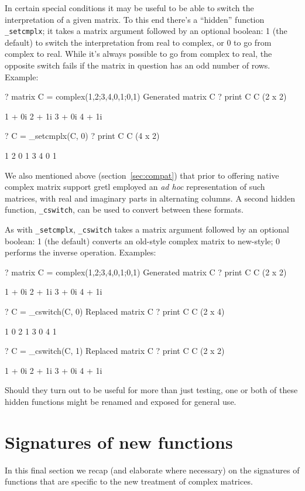 \documentclass{article}
\begin{document}
In certain special conditions it may be useful to be able to switch
the interpretation of a given matrix. To this end there's a ``hidden''
function \verb|_setcmplx|; it takes a matrix argument followed by an
optional boolean: 1 (the default) to switch the interpretation from
real to complex, or 0 to go from complex to real. While it's always
possible to go from complex to real, the opposite switch fails if the
matrix in question has an odd number of rows. Example:
\begin{code}
? matrix C = complex({1,2;3,4},{0,1;0,1})
Generated matrix C
? print C
C (2 x 2)

 1 + 0i   2 + 1i
 3 + 0i   4 + 1i

? C = _setcmplx(C, 0)
? print C
C (4 x 2)

  1   2
  0   1
  3   4
  0   1
\end{code}

We also mentioned above (section~\ref{sec:compat}) that prior to
offering native complex matrix support gretl employed an \textit{ad
  hoc} representation of such matrices, with real and imaginary parts
in alternating columns. A second hidden function, \verb|_cswitch|, can
be used to convert between these formats.

As with \verb|_setcmplx|, \verb|_cswitch| takes a matrix argument
followed by an optional boolean: 1 (the default) converts an old-style
complex matrix to new-style; 0 performs the inverse operation.
Examples:
\begin{code}
? matrix C = complex({1,2;3,4},{0,1;0,1})
Generated matrix C
? print C
C (2 x 2)

 1 + 0i   2 + 1i
 3 + 0i   4 + 1i

? C = _cswitch(C, 0)
Replaced matrix C
? print C
C (2 x 4)

  1   0   2   1
  3   0   4   1

? C = _cswitch(C, 1)
Replaced matrix C
? print C
C (2 x 2)

 1 + 0i   2 + 1i
 3 + 0i   4 + 1i
\end{code}

Should they turn out to be useful for more than just testing, one or
both of these hidden functions might be renamed and exposed for
general use.

\section{Signatures of new functions}
\label{sec:newsigs}

In this final section we recap (and elaborate where necessary) on the
signatures of functions that are specific to the new treatment of
complex matrices.
\end{document}
